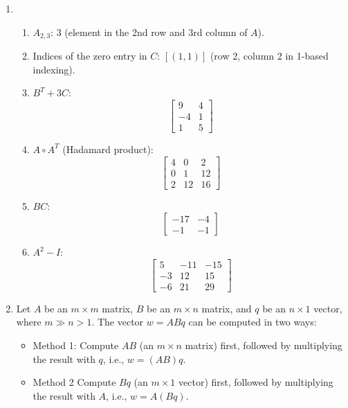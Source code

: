 \documentclass[12pt]{article}
\begin{document}
\begin{enumerate}
\item \begin{enumerate}
    \item \( A_{2,3} \): \( 3 \) (element in the 2nd row and 3rd column of \( A \)).
    
    \item Indices of the zero entry in \( C \): \( [(1, 1)] \) (row 2, column 2 in 1-based indexing).
    
    \item \( B^T + 3C \):
    \[
    \begin{bmatrix}
    9 & 4 \\
    -4 & 1 \\
    1 & 5
    \end{bmatrix}
    \]
    
    \item \( A \circ A^T \) (Hadamard product):
    \[
    \begin{bmatrix}
    4 & 0 & 2 \\
    0 & 1 & 12 \\
    2 & 12 & 16
    \end{bmatrix}
    \]
    
    \item \( BC \):
    \[
    \begin{bmatrix}
    -17 & -4 \\
    -1 & -1
    \end{bmatrix}
    \]
    
    \item \( A^2 - I \):
    \[
    \begin{bmatrix}
    5 & -11 & -15 \\
    -3 & 12 & 15 \\
    -6 & 21 & 29
    \end{bmatrix}
    \]
\end{enumerate}

\item 
Let \( A \) be an \( m \times m \) matrix, \( B \) be an \( m \times n \) matrix, and \( q \) be an \( n \times 1 \) vector, where \( m \gg n > 1 \). The vector \( w = ABq \) can be computed in two ways:

\begin{itemize}
    \item Method 1: Compute \( AB \) (an \( m \times n \) matrix) first, followed by multiplying the result with \( q \), i.e., \( w = (AB)q \).
    \item Method 2 Compute \( Bq \) (an \( m \times 1 \) vector) first, followed by multiplying the result with \( A \), i.e., \( w = A(Bq) \).
\end{itemize}


\end{enumerate}
\end{document}
